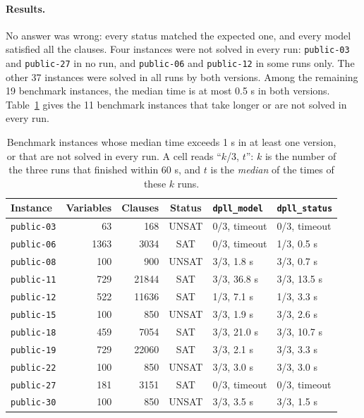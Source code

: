 \paragraph{Results.}
No answer was wrong: every status matched the expected one, and every model satisfied all the clauses. Four instances were not solved in every run: \texttt{public-03} and \texttt{public-27} in no run, and \texttt{public-06} and \texttt{public-12} in some runs only. The other 37 instances were solved in all runs by both versions. Among the remaining 19 benchmark instances, the median time is at most 0.5 s in both versions. Table~\ref{tab:q2-results} gives the 11 benchmark instances that take longer or are not solved in every run.
\begin{table}[htbp]
\centering
\begin{tabular}{@{}lrrcll@{}}
\toprule
Instance & Variables & Clauses & Status & \texttt{dpll\_model} & \texttt{dpll\_status}\\
\midrule
\texttt{public-03} & 63 & 168 & UNSAT & 0/3, timeout & 0/3, timeout\\
\texttt{public-06} & 1363 & 3034 & SAT & 0/3, timeout & 1/3, 0.5 s\\
\texttt{public-08} & 100 & 900 & UNSAT & 3/3, 1.8 s & 3/3, 0.7 s\\
\texttt{public-11} & 729 & 21844 & SAT & 3/3, 36.8 s & 3/3, 13.5 s\\
\texttt{public-12} & 522 & 11636 & SAT & 1/3, 7.1 s & 1/3, 3.3 s\\
\texttt{public-15} & 100 & 850 & UNSAT & 3/3, 1.9 s & 3/3, 2.6 s\\
\texttt{public-18} & 459 & 7054 & SAT & 3/3, 21.0 s & 3/3, 10.7 s\\
\texttt{public-19} & 729 & 22060 & SAT & 3/3, 2.1 s & 3/3, 3.3 s\\
\texttt{public-22} & 100 & 850 & UNSAT & 3/3, 3.0 s & 3/3, 3.0 s\\
\texttt{public-27} & 181 & 3151 & SAT & 0/3, timeout & 0/3, timeout\\
\texttt{public-30} & 100 & 850 & UNSAT & 3/3, 3.5 s & 3/3, 1.5 s\\
\bottomrule
\end{tabular}
\caption{Benchmark instances whose median time exceeds 1 s in at least one version, or that are not solved in every run. A cell reads ``$k$/3, $t$'': $k$ is the number of the three runs that finished within 60 s, and $t$ is the \emph{median} of the times of these $k$ runs.}
\label{tab:q2-results}
\end{table}

